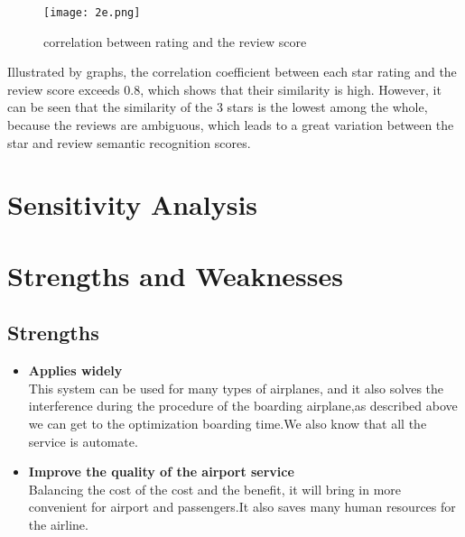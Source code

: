 \documentclass{mcmthesis}
\begin{document}
\begin{figure}[h]
  \small
  \centering
  \texttt{[image: 2e.png]}
  \caption{correlation between rating and the review score}
\end{figure}

Illustrated by graphs, the correlation coefficient between each star rating and the review score exceeds 0.8, which shows that their similarity is high. However, it can be seen that the similarity of the 3 stars is the lowest among the whole, because the reviews are ambiguous, which leads to a great variation between the star and review semantic recognition scores.


\section{ Sensitivity Analysis }

\section{ Strengths and Weaknesses }
\subsection{Strengths}
\begin{itemize}
  \item \textbf{Applies widely}\\
        This  system can be used for many types of airplanes, and it also
        solves the interference during  the procedure of the boarding
        airplane,as described above we can get to the  optimization
        boarding time.We also know that all the service is automate.
  \item \textbf{Improve the quality of the airport service}\\
        Balancing the cost of the cost and the benefit, it will bring in
        more convenient  for airport and passengers.It also saves many
        human resources for the airline.
\end{itemize}
\end{document}
